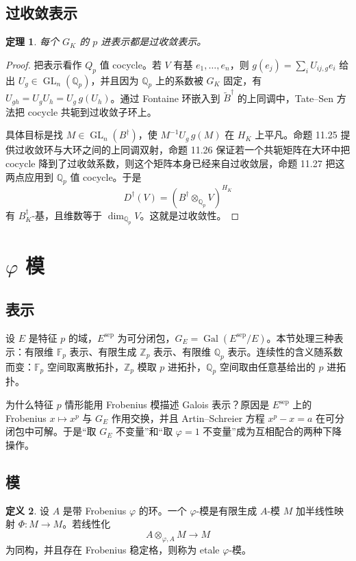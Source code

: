 \documentclass[11pt,a4paper,openany]{ctexbook}
\numberwithin{equation}{chapter}
\newcommand{\Q}{\mathbb{Q}}
\newcommand{\Z}{\mathbb{Z}}
\newcommand{\F}{\mathbb{F}}
\newcommand{\Gal}{\operatorname{Gal}}
\newcommand{\GL}{\operatorname{GL}}
\theoremstyle{plain}
\newtheorem{theorem}{定理}[chapter]
\theoremstyle{definition}
\newtheorem{definition}[theorem]{定义}
\theoremstyle{remark}
\begin{document}
\subsection{过收敛表示}

\begin{theorem}
每个 $G_K$ 的 $p$ 进表示都是过收敛表示。
\end{theorem}

\begin{proof}
把表示看作 $Q_p$ 值 cocycle。若 $V$ 有基 $e_1,\ldots,e_n$，则 $g(e_j)=\sum_i U_{ij,g}e_i$ 给出 $U_g\in\GL_n(\Q_p)$，并且因为 $\Q_p$ 上的系数被 $G_K$ 固定，有 $U_{gh}=U_gU_h=U_g\,g(U_h)$。通过 Fontaine 环嵌入到 $\widetilde B^\dagger$ 的上同调中，Tate--Sen 方法把 cocycle 共轭到过收敛子环上。

具体目标是找 $M\in\GL_n(B^\dagger)$，使 $M^{-1}U_g\,g(M)$ 在 $H_K$ 上平凡。命题 11.25 提供过收敛环与大环之间的上同调双射，命题 11.26 保证若一个共轭矩阵在大环中把 cocycle 降到了过收敛系数，则这个矩阵本身已经来自过收敛层，命题 11.27 把这两点应用到 $\Q_p$ 值 cocycle。于是
\[
  D^\dagger(V)=(B^\dagger\otimes_{\Q_p}V)^{H_K}
\]
有 $B_K^\dagger$-基，且维数等于 $\dim_{\Q_p}V$。这就是过收敛性。
\end{proof}

\section{\texorpdfstring{$\varphi$ 模}{phi 模}}

\subsection{表示}

设 $E$ 是特征 $p$ 的域，$E^{\mathrm{sep}}$ 为可分闭包，$G_E=\Gal(E^{\mathrm{sep}}/E)$。本节处理三种表示：有限维 $\F_p$ 表示、有限生成 $\Z_p$ 表示、有限维 $\Q_p$ 表示。连续性的含义随系数而变：$\F_p$ 空间取离散拓扑，$\Z_p$ 模取 $p$ 进拓扑，$\Q_p$ 空间取由任意基给出的 $p$ 进拓扑。

为什么特征 $p$ 情形能用 Frobenius 模描述 Galois 表示？原因是 $E^{\mathrm{sep}}$ 上的 Frobenius $x\mapsto x^p$ 与 $G_E$ 作用交换，并且 Artin--Schreier 方程 $x^p-x=a$ 在可分闭包中可解。于是“取 $G_E$ 不变量”和“取 $\varphi=1$ 不变量”成为互相配合的两种下降操作。

\subsection{模}

\begin{definition}
设 $A$ 是带 Frobenius $\varphi$ 的环。一个 $\varphi$-模是有限生成 $A$-模 $M$ 加半线性映射 $\Phi:M\to M$。若线性化
\[
  A\otimes_{\varphi,A}M\longrightarrow M
\]
为同构，并且存在 Frobenius 稳定格，则称为 etale $\varphi$-模。
\end{definition}
\end{document}
